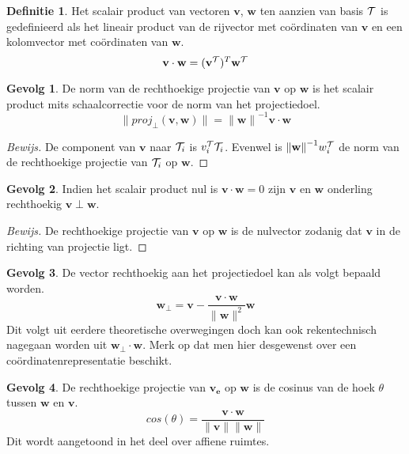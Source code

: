 \documentclass{amsart}
\theoremstyle{definition}
\newtheorem{dfn}{Definitie}[section]
\newtheorem{csq}{Gevolg}[section]
\newenvironment{bewijs}{\begin{proof}[Bewijs]}{\end{proof}}
\newcommand{\norm}[1]{\lVert{#1}\rVert}
\newcommand{\vvec}[1][v]{\mathbf{#1}}
\newcommand{\uvec}[1][v]{\vvec[#1]_\mathbf{e}}
\newcommand{\vnorm}[1]{\norm{\vvec[#1]}}
\newcommand{\vecrow}[1][a]{\mathcal{\MakeUppercase{#1}}}
\newcommand{\rvec}[2][i]{{#2}_{#1}}
\newcommand{\rvecr}[2][i]{\rvec[#1]{\vecrow[#2]}}
\newcommand{\cvec}[2]{{#1}^{#2}}
\newcommand{\cvecv}[2][v]{\cvec{\vvec[#1]}{#2}}
\newcommand{\cvecva}[1][a]{\cvecv{\vecrow[#1]}}
\newcommand{\cvecc}[2][a]{\cvecv[#2]{\vecrow[#1]}}
\newcommand{\vcord}[3]{{#1}_{#2}^{#3}}
\newcommand{\vcordv}[3][v]{\vcord{#1}{#2}{\vecrow[#3]}}
\newcommand{\vcordvi}[2][i]{\vcordv{#1}{#2}}
\begin{document}
\begin{dfn}
	Het scalair product van vectoren $\vvec$, $\vvec[w]$ ten aanzien van basis $\vecrow[t]$ is gedefinieerd als het lineair product van de rijvector met coördinaten van $\vvec$ en een kolomvector met coördinaten van $\vvec[w]$.
	\begin{equation*}
		\vvec \cdot \vvec[w] = (\cvecva[t])^T \cvecc[t]{w}
	\end{equation*}
\end{dfn}

\begin{csq}
	De norm van de rechthoekige projectie van $\vvec$ op $\vvec[w]$ is het scalair product mits schaalcorrectie voor de norm van het projectiedoel.
	\begin{equation*}
		\norm{proj_\perp(\vvec, \vvec[w])} = {\vnorm w}^{-1}\vvec \cdot \vvec[w]
	\end{equation*}
	\begin{bewijs}
		De component van $\vvec$ naar $\rvecr{t}$ is $\vcordvi{t}\rvecr{t}$. Evenwel is ${\vnorm w}^{-1}\vcordv[w]{i}{t}$ de norm van de rechthoekige projectie van $\rvecr{t}$ op $\vvec[w]$.
	\end{bewijs}
\end{csq}

\begin{csq}
	Indien het scalair product nul is $\vvec \cdot\vvec[w] = 0$ zijn $\vvec$ en $\vvec[w]$ onderling rechthoekig $\vvec\perp\vvec[w]$.
	\begin{bewijs}
		De rechthoekige projectie van $\vvec$ op $\vvec[w]$ is de nulvector zodanig dat $\vvec$ in de richting van projectie ligt.
	\end{bewijs}
\end{csq}

\begin{csq}
	De vector rechthoekig aan het projectiedoel kan als volgt bepaald worden.
	\begin{equation*}
		\vvec[w]_\perp = \vvec - \frac{\vvec\cdot\vvec[w]}{\vnorm w^2}\vvec[w]
	\end{equation*}
	Dit volgt uit eerdere theoretische overwegingen doch kan ook rekentechnisch nagegaan worden uit $\vvec[w]_\perp\cdot\vvec[w]$.
	Merk op dat men hier desgewenst over een coördinatenrepresentatie beschikt.
\end{csq}

\begin{csq}
	De rechthoekige projectie van $\uvec$ op $\vvec[w]$ is de cosinus van de hoek $\theta$ tussen $\vvec[w]$ en $\vvec$.
	\begin{equation*}
		cos(\theta) = \frac{\vvec \cdot \vvec[w]}{\vnorm v\vnorm w}
	\end{equation*}
	Dit wordt aangetoond in het deel over affiene ruimtes. 
\end{csq}
\end{document}
